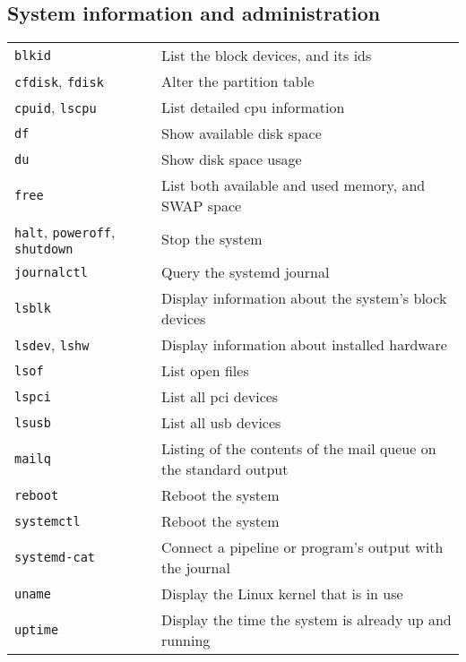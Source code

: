 \documentclass[10pt]{article}
\begin{document}
\cheatsheet

\begin{multicols}{2}

\section{System information and administration}
\begin{tabular}{ p{2.5cm} p{8.5cm} }
  \hline
  \texttt{blkid} & List the block devices, and its ids \\
  \rowcolor{Gray}
  \texttt{cfdisk}, \texttt{fdisk} & Alter the partition table \\
  \texttt{cpuid}, \texttt{lscpu} & List detailed cpu information \\
  \rowcolor{Gray}
  \texttt{df} & Show available disk space \\
  \texttt{du} & Show disk space usage \\
  \rowcolor{Gray}
  \texttt{free} & List both available and used memory, and SWAP space  \\
  \texttt{halt}, \texttt{poweroff}, \texttt{shutdown} & Stop the system \\
  \rowcolor{Gray}
  \texttt{journalctl} & Query the systemd journal \\
  \texttt{lsblk} & Display information about the system's block devices\\
  \rowcolor{Gray}
  \texttt{lsdev}, \texttt{lshw} & Display information about installed hardware\\
  \texttt{lsof} & List open files \\
  \rowcolor{Gray}
  \texttt{lspci} & List all pci devices\\
  \texttt{lsusb} & List all usb devices\\
  \rowcolor{Gray}
  \texttt{mailq} & Listing of the contents of the mail queue on the standard output\\
  \texttt{reboot} & Reboot the system\\
  \rowcolor{Gray}
  \texttt{systemctl} & Reboot the system\\
  \texttt{systemd-cat} & Connect a pipeline or program's output with the journal\\
  \rowcolor{Gray}
  \texttt{uname} & Display the Linux kernel that is in use\\
  \texttt{uptime} & Display the time the system is already up and running\\
  \hline
\end{tabular}


\end{multicols}
\end{document}
